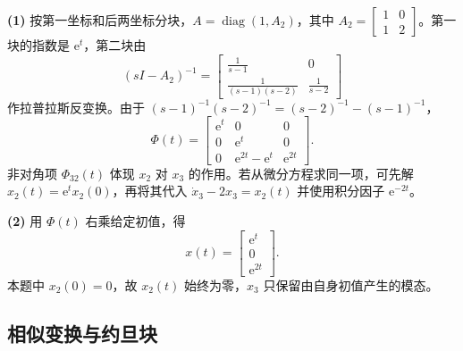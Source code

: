 

\sol \textbf{(1)} 按第一坐标和后两坐标分块，$A=\operatorname{diag}(1,A_2)$，其中 $A_2=\begin{bmatrix}1&0\\1&2\end{bmatrix}$。第一块的指数是 $\mathrm e^t$，第二块由
\[
(sI-A_2)^{-1}
=\begin{bmatrix}
\frac{1}{s-1}&0\\[2pt]
\frac{1}{(s-1)(s-2)}&\frac{1}{s-2}
\end{bmatrix}
\]
作拉普拉斯反变换。由于 $(s-1)^{-1}(s-2)^{-1}=(s-2)^{-1}-(s-1)^{-1}$，
\[
\Phi(t)=\begin{bmatrix}
\mathrm e^t&0&0\\
0&\mathrm e^t&0\\
0&\mathrm e^{2t}-\mathrm e^t&\mathrm e^{2t}
\end{bmatrix}.
\]
非对角项 $\Phi_{32}(t)$ 体现 $x_2$ 对 $x_3$ 的作用。若从微分方程求同一项，可先解 $x_2(t)=\mathrm e^t x_2(0)$，再将其代入 $\dot x_3-2x_3=x_2(t)$ 并使用积分因子 $\mathrm e^{-2t}$。

\textbf{(2)} 用 $\Phi(t)$ 右乘给定初值，得
\[
x(t)=\begin{bmatrix}\mathrm e^t\\0\\\mathrm e^{2t}\end{bmatrix}.
\]
本题中 $x_2(0)=0$，故 $x_2(t)$ 始终为零，$x_3$ 只保留由自身初值产生的模态。

\subsection{相似变换与约旦块}

